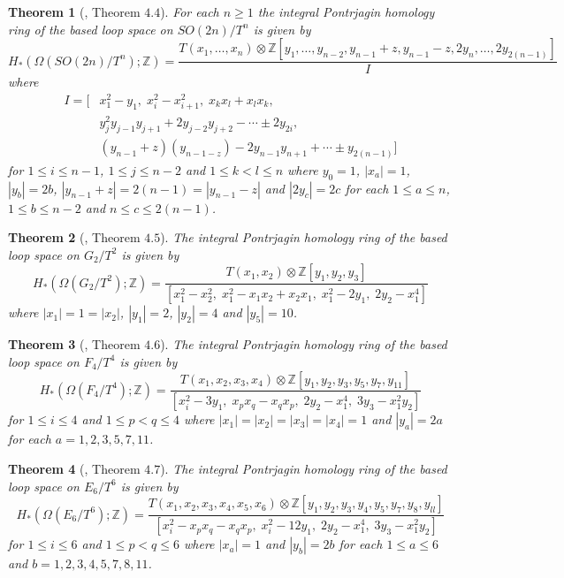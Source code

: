 \documentclass{article}
\theoremstyle{plain}
\newtheorem{thm}{Theorem}[section]
\theoremstyle{definition}
\numberwithin{thm}{section}
\begin{document}
	\begin{thm}[\cite{homology_Lflags}, Theorem $4.4$]
		For each $n\geq 1$ the integral Pontrjagin homology ring of the based loop space on $SO(2n)/T^n$ is given by
		\begin{equation*}
			H_*(\Omega(SO(2n)/T^n);\mathbb{Z})=
			\frac{T(x_1,\dots,x_n)\otimes\mathbb{Z}[y_1,\dots,y_{n-2},y_{n-1}+z,y_{n-1}-z,2y_n,\dots,2y_{2(n-1)}]}{I}
		\end{equation*}
		where
		\begin{align*}
			I=
			[&x_1^2-y_1, \; x_i^2-x_{i+1}^2, \; x_kx_l+x_lx_k, \; \\ &y_j^2y_{j-1}y_{j+1}+2y_{j-2}y_{j+2}-\cdots\pm2y_{2i},\; \\
			&(y_{n-1}+z)(y_{n-1-z})-2y_{n-1}y_{n+1}+\cdots\pm y_{2(n-1)}]
		\end{align*}
		for $1\leq i\leq n-1$, $1\leq j\leq n-2$ and $1\leq k<l \leq n$ where $y_0=1$, $|x_a|=1$, $|y_b|=2b$, $|y_{n-1}+z|=2(n-1)=|y_{n-1}-z|$ and $|2y_c|=2c$
		for each $1\leq a \leq n$, $1\leq b \leq n-2$ and $n \leq c \leq 2(n-1)$.
	\end{thm}
	
	\begin{thm}[\cite{homology_Lflags}, Theorem $4.5$]
		The integral Pontrjagin homology ring of the based loop space on $G_2/T^2$ is given by
		\begin{equation*}
			H_*(\Omega(G_2/T^2);\mathbb{Z})=
			\frac{T(x_1,x_2) \otimes \mathbb{Z}[y_1,y_2,y_3]}
			{[x_1^2-x_2^2,\; x_1^2-x_1x_2+x_2x_1,\; x_1^2-2y_1, \; 2y_2-x_1^4]}
		\end{equation*}
		where $|x_1|=1=|x_2|$, $|y_1|=2$, $|y_2|=4$ and $|y_5|=10$.
	\end{thm}
	
	\begin{thm}[\cite{homology_Lflags}, Theorem $4.6$]
		The integral Pontrjagin homology ring of the based loop space on $F_4/T^4$ is given by
		\begin{equation*}
			H_*(\Omega(F_4/T^4);\mathbb{Z})=
			\frac{T(x_1,x_2,x_3,x_4)\otimes\mathbb{Z}[y_1,y_2,y_3,y_5,y_7,y_{11}]}
			{[x_i^2-3y_1,\; x_px_q-x_qx_p,\; 2y_2-x_1^4,\; 3y_3-x_1^2y_2]}
		\end{equation*}
		for $1\leq i \leq 4$ and $1\leq p<q\leq 4$ where $|x_1|=|x_2|=|x_3|=|x_4|=1$ and $|y_a|=2a$ for each $a=1,2,3,5,7,11$.
	\end{thm}
	
	\begin{thm}[\cite{homology_Lflags}, Theorem $4.7$]
		The integral Pontrjagin homology ring of the based loop space on $E_6/T^6$ is given by
		\begin{equation*}
			H_*(\Omega(E_6/T^6);\mathbb{Z})=
			\frac{T(x_1,x_2,x_3,x_4,x_5,x_6)\otimes\mathbb{Z}[y_1,y_2,y_3,y_4,y_5,y_7,y_8,y_{ll}]}
			{[x_i^2-x_px_q-x_qx_p,\; x_i^2-12y_1,\; 2y_2-x_1^4,\; 3y_3-x_1^2y_2]}
		\end{equation*}
		for $1\leq i \leq 6$ and $1\leq p<q\leq 6$
		where $|x_a|=1$ and $|y_b|=2b$ for each $1\leq a\leq 6$ and $b=1,2,3,4,5,7,8,11$.
	\end{thm}
\end{document}
